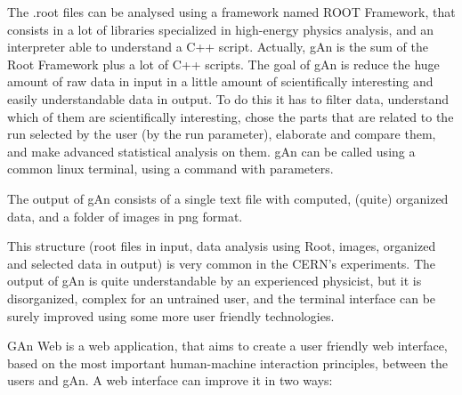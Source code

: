 The .root files can be analysed using a framework named ROOT Framework, that consists in a lot of libraries specialized in high-energy physics analysis, and an interpreter able to understand a C++ script.
Actually, gAn is the sum of the Root Framework plus a lot of C++ scripts.
The goal of gAn is reduce the huge amount of raw data in input in a little amount of scientifically interesting and easily understandable data in output. To do this it has to filter data, understand which of them are scientifically interesting, chose the parts that are related to the run selected by the user (by the run parameter), elaborate and compare them, and make advanced statistical analysis on them.  
gAn can be called using a common linux terminal, using a command with parameters. 

The output of gAn consists of a single text file with computed, (quite) organized data, and a folder of images in png format.


 
This structure (root files in input, data analysis using Root, images, organized and selected data in output) is very common in the CERN's experiments. 
The output of gAn is quite understandable by an experienced physicist, but it is disorganized, complex for an untrained user, and the terminal interface can be surely improved using some more user friendly technologies.


GAn Web is a web application, that aims to create a user friendly web interface, based on the most important human-machine interaction principles, between the users and gAn.
A web interface can improve it in two ways:

